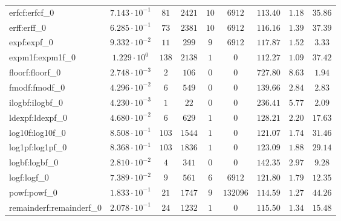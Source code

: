 \begin{tabular}{|l|c|c|c|c|c|c|c|c|}
erfcf:erfcf\_0               & $ 7.143 \cdot 10^{-1} $ & $ 81     $ & $ 2421  $ & $ 10  $ & $ 6912   $ & $ 113.40      $ & $ 1.18    $ & $ 35.86   $ \\
erff:erff\_0                 & $ 6.285 \cdot 10^{-1} $ & $ 73     $ & $ 2381  $ & $ 10  $ & $ 6912   $ & $ 116.16      $ & $ 1.39    $ & $ 37.39   $ \\
expf:expf\_0                 & $ 9.332 \cdot 10^{-2} $ & $ 11     $ & $ 299   $ & $ 9   $ & $ 6912   $ & $ 117.87      $ & $ 1.52    $ & $ 3.33    $ \\
expm1f:expm1f\_0             & $ 1.229 \cdot 10^{0}  $ & $ 138    $ & $ 2138  $ & $ 1   $ & $ 0      $ & $ 112.27      $ & $ 1.09    $ & $ 37.42   $ \\
floorf:floorf\_0             & $ 2.748 \cdot 10^{-3} $ & $ 2      $ & $ 106   $ & $ 0   $ & $ 0      $ & $ 727.80      $ & $ 8.63    $ & $ 1.94    $ \\
fmodf:fmodf\_0               & $ 4.296 \cdot 10^{-2} $ & $ 6      $ & $ 549   $ & $ 0   $ & $ 0      $ & $ 139.66      $ & $ 2.84    $ & $ 2.83    $ \\
ilogbf:ilogbf\_0             & $ 4.230 \cdot 10^{-3} $ & $ 1      $ & $ 22    $ & $ 0   $ & $ 0      $ & $ 236.41      $ & $ 5.77    $ & $ 2.09    $ \\
ldexpf:ldexpf\_0             & $ 4.680 \cdot 10^{-2} $ & $ 6      $ & $ 629   $ & $ 1   $ & $ 0      $ & $ 128.21      $ & $ 2.20    $ & $ 17.63   $ \\
log10f:log10f\_0             & $ 8.508 \cdot 10^{-1} $ & $ 103    $ & $ 1544  $ & $ 1   $ & $ 0      $ & $ 121.07      $ & $ 1.74    $ & $ 31.46   $ \\
log1pf:log1pf\_0             & $ 8.368 \cdot 10^{-1} $ & $ 103    $ & $ 1836  $ & $ 1   $ & $ 0      $ & $ 123.09      $ & $ 1.88    $ & $ 29.14   $ \\
logbf:logbf\_0               & $ 2.810 \cdot 10^{-2} $ & $ 4      $ & $ 341   $ & $ 0   $ & $ 0      $ & $ 142.35      $ & $ 2.97    $ & $ 9.28    $ \\
logf:logf\_0                 & $ 7.389 \cdot 10^{-2} $ & $ 9      $ & $ 561   $ & $ 6   $ & $ 6912   $ & $ 121.80      $ & $ 1.79    $ & $ 12.35   $ \\
powf:powf\_0                 & $ 1.833 \cdot 10^{-1} $ & $ 21     $ & $ 1747  $ & $ 9   $ & $ 132096 $ & $ 114.59      $ & $ 1.27    $ & $ 44.26   $ \\
remainderf:remainderf\_0     & $ 2.078 \cdot 10^{-1} $ & $ 24     $ & $ 1232  $ & $ 1   $ & $ 0      $ & $ 115.50      $ & $ 1.34    $ & $ 15.48   $ \\

\end{tabular}
